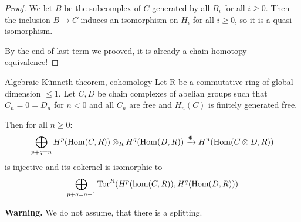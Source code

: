 \documentclass[language=english]{TemplateLecture}
\begin{document}
\begin{proof}
    We let \(B\) be the subcomplex of \(C\) generated by all \(B_i\) for all \(i \geq 0\). Then the inclusion \(B \to C\) induces an isomorphism on \(H_i\) for all \( i \geq 0\), so it is a quasi-isomorphism.

    By the end of last term we prooved, it is already a chain homotopy equivalence!
\end{proof}




\begin{thm}{Algebraic Künneth theorem, cohomology}{}
    Let R be a commutative ring of global dimension \(\leq 1\). Let \(C,D\) be chain complexes of abelian groups such that \(C_n = 0 = D_n\) for \(n < 0\) and all \(C_n\) are free and \(H_n(C)\) is finitely generated free.

    Then for all \(n \geq 0\):
    \[\bigoplus_{p+q = n} H^p(\operatorname{Hom}(C,R)) \otimes_R H^q(\operatorname{Hom}(D,R)) \xrightarrow{\Phi} H^n(\operatorname{Hom}(C\otimes D, R))\]
    is injective and its cokernel is isomorphic to
    \[\bigoplus_{p+q = n+1} \mathrm{Tor}^R(H^p(\hom(C, R)), H^q(\operatorname{Hom}(D,R)))\]
\end{thm}

\textbf{Warning.} We do not assume, that there is a splitting.
\end{document}
